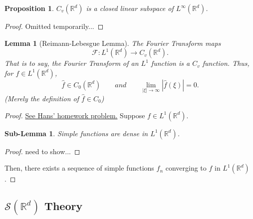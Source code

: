\documentclass[letterpaper,twoside,12pt]{article}
\theoremstyle{mystyle}
\newtheorem{lemma}[theorem]{Lemma}
\newtheorem{slem}{Sub-Lemma}
\newtheorem{prop}{Proposition}[section]
\newcommand{\R}{{\mathbb R}}
\newcommand{\cg}{\color{gray}}
\newcommand{\cbk}{\color{black}}
\newcommand{\cred}{\color{red}}
\newcommand{\cblu}{\color{blue}}
\begin{document}
\begin{prop}
  $C_v\left( \R^d \right)$ is a closed linear subspace of $L^\infty\left( \R^d \right)$. 
\end{prop}
\begin{proof}
  \cred Omitted temporarily...\cbk 
\end{proof}

\begin{lemma}[Reimann-Lebesgue Lemma]
  The Fourier Transform maps 
  \[\mathcal{F}:{L^1}\left( {{\mathbb{R}^d}} \right) \to {C_v}\left( {{\mathbb{R}^d}} \right).\]
  \cg That is to say, the Fourier Transform of an $L^1$ function is a $C_v$ function. \cbk Thus, for $f\in L^1\left( \R^d \right)$, 
  \[\hat f \in {C_0}\left( {{\mathbb{R}^d}} \right)\qquad and\qquad \mathop {\lim }\limits_{\left| \xi  \right| \to \infty } \left| {\hat f\left( \xi  \right)} \right| = 0.\] (Merely the definition of $\hat f \in C_0$)
\end{lemma}
\begin{proof}
  \href{https://web.ma.utexas.edu/users/koch/teaching/M383C-F22/access/M383C-F22-HW2-Solutions.pdf}{See Hans' homework problem.} Suppose $f \in L^1\left( \R^d \right)$. 

  \cblu
  \begin{slem} 
    Simple functions are dense in $L^1\left( \R^d \right)$. 
  \end{slem}
  \begin{proof}
    need to show...
  \end{proof}
  \cbk 
  Then, there exists a sequence of simple functions $f_n$ converging to $f$ in $L^1\left( \R^d \right)$.  
  

  \cbk


\end{proof}































\subsection{$\mathcal S \left( \R^d \right)$ Theory}
\end{document}
